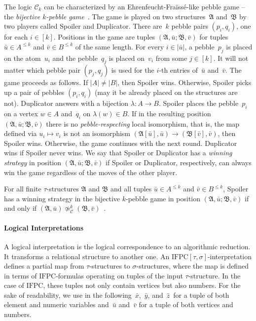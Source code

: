 \documentclass[]{lmcs}
\newcommand{\defining}[1]{\emph{#1}}
\newcommand{\uniVarA}{x}
\newcommand{\uniVarB}{y}
\newcommand{\uniVarC}{z}
\newcommand{\tup}[1]{\bar{#1}}
\newcommand{\vertA}{u}
\newcommand{\vertB}{v}
\newcommand{\vertC}{w}
\newcommand{\StructA}{\mathfrak{A}}
\newcommand{\StructB}{\mathfrak{B}}
\newcommand{\StructVA}{A}
\newcommand{\StructVB}{B}
\newcommand{\sig}{\tau}
\newcommand{\sigA}{\tau}
\newcommand{\sigB}{\sigma}
\newcommand{\IFPC}{\ensuremath{\mathrm{IFPC}}}
\newcommand{\Ck}[1]{\mathcal{C}_{#1}}
\newcommand{\gamebij}{\lambda}
\newcommand{\kequiv}[1]{\simeq^#1_{\mathcal{C}}}
\begin{document}
The logic $\Ck{k}$ can be characterized by an Ehrenfeucht-Fraïssé-like pebble game -- the \defining{bijective $k$-pebble game}~\cite{Hella96}.
The game is played on two structures~$\StructA$ and~$\StructB$
by two players called Spoiler and Duplicator.
There are~$k$ pebble pairs $(p_i,q_i)$, one for each $i \in [k]$.
Positions in the game are tuples $(\StructA, \tup{\vertA}; \StructB, \tup{\vertB})$
for tuples $\tup{\vertA}\in \StructVA^{\leq k}$ and
$\tup{\vertB} \in \StructVB^{\leq k}$ of the same length.
For every $i \in |\tup{\vertA}|$,
a pebble~$p_j$ is placed on the atom~$\vertA_i$
and the pebble~$q_j$ is placed on~$\vertB_i$ from some $j \in[k]$.
It will not matter which pebble pair $(p_j,q_j)$ is used for the $i$-th entries
of~$\tup{\vertA}$ and~$\tup{\vertB}$.
The game proceeds as follows.
If $|\StructVA| \neq |\StructVB|$, then Spoiler wins.
Otherwise,
Spoiler picks up a pair of pebbles $(p_i, q_i)$ (may it be already placed on the structures are not).
Duplicator answers with a bijection $\gamebij \colon \StructVA \to \StructVB$.
Spoiler places the pebble~$p_i$ on a vertex $\vertC \in \StructVA$
and~$q_i$ on $\gamebij(\vertC) \in \StructVB$.
If in the resulting position $(\StructA, \tup{\vertA}; \StructB, \tup{\vertB})$
there is no \defining{pebble-respecting} local isomorphism,
that is, the map defined via $\vertA_i \mapsto \vertB_i$
is not an isomorphism $(\StructA[\tup{\vertA}],\tup{\vertA}) \to (\StructB[\tup{\vertB}],\tup{\vertB})$,
then Spoiler wins.
Otherwise, the game continues with the next round.
Duplicator wins if Spoiler never wins.
We say that Spoiler or Duplicator has a \defining{winning strategy} in
position $(\StructA, \tup{\vertA}; \StructB, \tup{\vertB})$
if Spoiler or Duplicator, respectively, can always win the game  regardless of the moves of the other player.

For all finite $\sig$-structures $\StructA$ and $\StructB$
and all tuples $\tup{\vertA} \in \StructVA^{\leq k}$ and $\tup{\vertB} \in \StructVB^{\leq k}$,
Spoiler has a winning strategy in the bijective $k$-pebble game
in position $(\StructA, \tup{\vertA}; \StructB, \tup{\vertB})$
if and only if  $(\StructA,\tup{\vertA})\not\kequiv{k} (\StructB,\tup{\vertB})$~\cite{Hella96}.


\paragraph{Logical Interpretations}
A logical interpretation is the logical correspondence to an algorithmic reduction.
It transforms a relational structure to another one.
An $\IFPC[\sigA,\sigB]$-interpretation
defines a partial map from $\sigA$-structures to $\sigB$-structures,
where the map is defined in terms of \IFPC{}-formulas
operating on tuples of the input $\sigA$\nobreakdash-structure.
In the case of \IFPC{}, these tuples not only contain vertices
but also numbers.
For the sake of readability,
we use in the following~$\tup{\uniVarA}$,~$\tup{\uniVarB}$, and~$\tup{\uniVarC}$~for a tuple of both element and numeric variables
and~$\tup{\vertA}$ and~$\tup{\vertB}$ for a tuple of both vertices and numbers.
\end{document}
